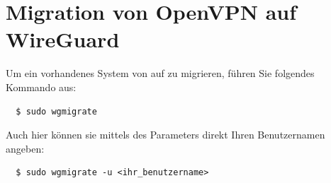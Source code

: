 \documentclass[a4paper,11pt,authoryear]{article}
\begin{document}
\section{Migration von OpenVPN auf WireGuard}
Um ein vorhandenes System von  auf  zu migrieren, führen Sie folgendes Kommando aus:
\begin{verbatim}
  $ sudo wgmigrate
\end{verbatim}
Auch hier können sie mittels des Parameters  direkt Ihren Benutzernamen angeben:
\begin{verbatim}
  $ sudo wgmigrate -u <ihr_benutzername>
\end{verbatim}

{}

\end{document}
